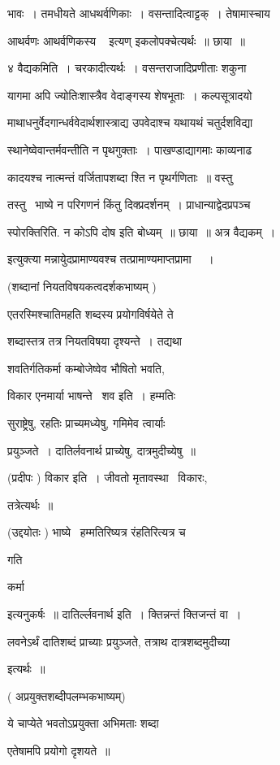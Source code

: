 \documentclass[11pt, openany]{book}
\begin{document}
भावः~। तमधीयते आधथर्वणिकाः~। वसन्तादित्वाट्टक्~। तेषामास्चाय 

आथर्वणः {\qt आथर्वणिकस्य \textendash\ } इत्यण् इकलोपक्चेत्यर्थः~॥ छाया~॥ 

४ वैद्यकमिति~। चरकादीत्यर्थः~। वसन्तराजादिप्रणीताः शकुना \textendash\ 

यागमा अपि ज्योतिःशास्त्रैव वेदाङ्गस्य शेषभूताः~। कल्पसूत्रादयो 

माथाधनुर्वेदगान्धर्ववेदार्थशास्त्राद्य उपवेदाश्च यथायथं चतुर्दशविद्या \textendash\ 


स्थानेष्वेवान्तर्मवन्तीति न पृथगुक्ताः~। पाखण्डाद्यागमाः काव्यनाढ \textendash\ 

कादयश्च नात्मन्तं वर्जितापशब्दा श्ति न पृथर्गणिताः~॥ वस्तु \textendash\ 

तस्तु \textendash\ भाष्ये न परिगणनं किंतु दिक्प्रदर्शनम्~। प्राधान्याद्वेदप्रपञ्च \textendash\ 

स्पोरक्तिरिति. न कोऽपि दोष इति बोध्यम्~॥ छाया~॥ अत्र वैद्यकम्~। 

इत्युक्त्या मन्नायुेदप्रामाण्यवश्च तत्प्रामाण्यमाप्तप्रामा \textendash\ 
 ~। 





(शब्दानां नियतविषयकत्वदर्शकभाष्यम् ) 

एतरस्मिश्चातिमहति शब्दस्य प्रयोगविर्षयेते ते 

शब्दास्तत्र तत्र नियतविषया दृश्यन्ते~। तद्यथा \textendash\ 

शवतिर्गतिकर्मा कम्बोजेष्वेव भौषितो भवति, 

विकार एनमार्या भाषन्ते \textendash\ शव इति~। हम्मतिः 

सुराष्ट्रेषु, रहतिः प्राच्यमध्येषु, गमिमेव त्वार्याः 

प्रयुञ्जते~। दातिर्लवनार्थ प्राच्येषु, दात्रमुदीच्येषु~॥ 

(प्रदीपः ) विकार इति~। जीवतो मृतावस्था \textendash\ विकारः, 

तत्रेत्यर्थः~॥ 

(उद्दयोतः ) भाष्ये \textendash\ हम्मतिरिष्यत्र रंहतिरित्यत्र च {\qt गति \textendash\ 

कर्मा} इत्यनुकर्षः~॥ दातिर्ल्लवनार्थ इति~। क्तिन्नन्तं क्तिजन्तं वा~। 


लवनेऽर्थं दातिशब्दं प्राच्याः प्रयुञ्जते, तत्राथ दात्रशब्दमुदीच्या 

इत्यर्थः~॥ 

( अप्रयुक्तशब्दीपलम्भकभाष्यम्) 

ये चाप्येते भवतोऽप्रयुक्ता अभिमताः शब्दा 

एतेषामपि प्रयोगो दृशयते~॥ 
\end{document}
